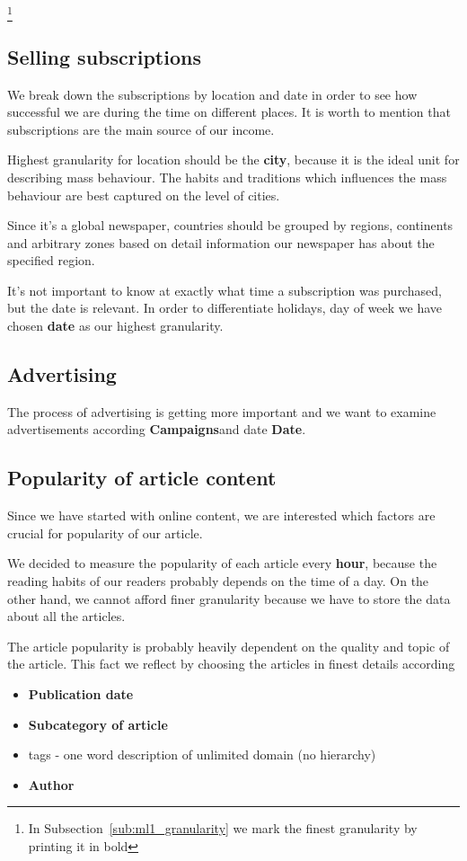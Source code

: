 \footnote{In Subsection~\ref{sub:ml1_granularity} we mark the finest granularity by printing it in bold} 

\subsection*{Selling subscriptions} 
We break down the subscriptions by location and date in order to see how successful we are during the time on different places. It is worth to mention that subscriptions are the main source of our income. 

Highest granularity for location should be the {\bf city}, because it is the ideal unit for describing mass behaviour.  The habits and traditions  which influences the mass behaviour are best captured on the level of cities. 

Since it's a global newspaper, countries should be grouped by regions, continents and arbitrary zones based on detail information our newspaper has about the specified region.

It's not important to know at exactly what time a subscription was purchased, but the date is relevant. 
In order to differentiate holidays, day of week we have chosen {\bf date} as our highest granularity. 

\subsection*{Advertising} 
The process of advertising is getting more important
and we want to examine advertisements according {\bf Campaigns}and date {\bf Date}.  

\subsection*{Popularity of article content} 
Since we have started with online content, we are interested which factors are crucial for popularity of our article.

We decided to measure the popularity of each article every {\bf hour}, because the reading habits of our readers probably depends on the time of a day. On the other hand, we cannot afford finer granularity because we have to store the data about all the articles.

The article popularity is probably heavily dependent on the quality and topic of the article. 
This fact we reflect by choosing the articles in finest details
according
\begin{itemize}
    \item {\bf Publication date}
    \item {\bf Subcategory of article}
    \item tags - one word description of unlimited domain (no hierarchy)
    \item {\bf Author}
\end{itemize}


